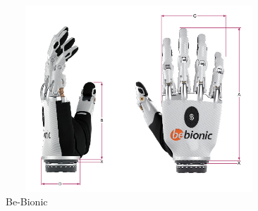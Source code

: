 \begin{figure}[H]
    \centering
    \includegraphics[width=10cm,height=7cm]{Figures/Contextual_figures/ProsthesesPics/Be-bionic.jpg}
    \caption{Be-Bionic \cite{Be-bionic}}
    \label{fig:Be-Bionic}
\end{figure}

